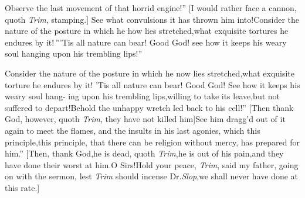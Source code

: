 \documentclass{article}
\begin{document}
\lqq Observe the last movement of that\break
\lqq horrid engine!” [I would rather face\break
a cannon, quoth \textit{Trim}, stamping.]\tsh\break
\lqq See what convulsions it has thrown\break
\lqq him into!\tsh Consider the nature of\break
\lqq the posture in which he how lies\break
\lqq stretched,\tsk what exquisite tortures he\break
\lqq endures by it!\,”\tsh [I hope ’tis not in\catch{\textit{Portugal}.]}
\textit{Portugal.}]\tsk \lqq ’Tis all nature can bear!\break
\lqq Good God! see how it keeps his weary\break
\lqq soul hanging upon his trembling lips!”

\lqq \tsk Consider the nature of the posture\break
\lqq in which he now lies stretched,\tsk what\break
\lqq exquisite torture he endures by it!\tsk\break
\lqq ’Tis all nature can bear! Good God!\break
\lqq See how it keeps his weary soul hang-\break
\lqq ing upon his trembling lips,\tsk willing\break
\lqq to take its leave,\tsh but not suffered\break
\lqq to depart!\tsk Behold the unhappy\break
\lqq wretch led back to his cell!” [Then\break
thank God, however, quoth \textit{Trim}, they\break
have not killed him]\tsk\lqq See him dragg’d\break
\lqq out of it again to meet the flames, and\break
\lqq the insults in his last agonies, which\break
\lqq this principle,\tsh this principle, that\break
\lqq there can be religion without mercy,\break
\lqq has prepared for him.” [Then, thank\break
God,\tsk he is dead, quoth \textit{Trim},\tsk he is
out of his pain,\tsk and they have
done their worst at him.\tsk O Sirs!\tsk Hold your peace,
\textit{Trim}, said my father, going on with the sermon, lest
\textit{Trim} should incense Dr.\@ \textit{Slop},\tsk we shall never
have done at this rate.]
\end{document}
